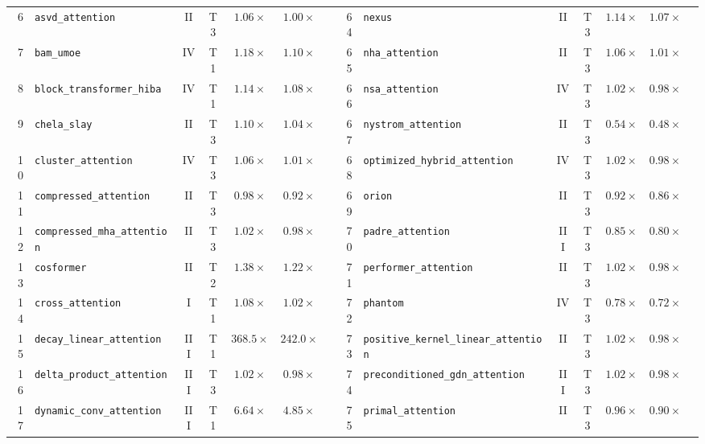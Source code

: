 \begin{table}[p]
{\begin{tabular}{r l c c c c l | r l c c c c l}
 6 & \texttt{asvd\_attention} & II & T3 & $1.06\times$ & $1.00\times$ & \passfast{} & 64 & \texttt{nexus} & II & T3 & $1.14\times$ & $1.07\times$ & \passfast{} \\
 7 & \texttt{bam\_umoe} & IV & T1 & $1.18\times$ & $1.10\times$ & \passfast{} & 65 & \texttt{nha\_attention} & II & T3 & $1.06\times$ & $1.01\times$ & \passfast{} \\
 8 & \texttt{block\_transformer\_hiba} & IV & T1 & $1.14\times$ & $1.08\times$ & \passfast{} & 66 & \texttt{nsa\_attention} & IV & T3 & $1.02\times$ & $0.98\times$ & \passslow{} \\
 9 & \texttt{chela\_slay} & II & T3 & $1.10\times$ & $1.04\times$ & \passfast{} & 67 & \texttt{nystrom\_attention} & II & T3 & $0.54\times$ & $0.48\times$ & \passslow{} \\
10 & \texttt{cluster\_attention} & IV & T3 & $1.06\times$ & $1.01\times$ & \passfast{} & 68 & \texttt{optimized\_hybrid\_attention} & IV & T3 & $1.02\times$ & $0.98\times$ & \passslow{} \\
11 & \texttt{compressed\_attention} & II & T3 & $0.98\times$ & $0.92\times$ & \passslow{} & 69 & \texttt{orion} & II & T3 & $0.92\times$ & $0.86\times$ & \passslow{} \\
12 & \texttt{compressed\_mha\_attention} & II & T3 & $1.02\times$ & $0.98\times$ & \passslow{} & 70 & \texttt{padre\_attention} & III & T3 & $0.85\times$ & $0.80\times$ & \passslow{} \\
13 & \texttt{cosformer} & II & T2 & $1.38\times$ & $1.22\times$ & \passfast{} & 71 & \texttt{performer\_attention} & II & T3 & $1.02\times$ & $0.98\times$ & \passslow{} \\
14 & \texttt{cross\_attention} & I & T1 & $1.08\times$ & $1.02\times$ & \passfast{} & 72 & \texttt{phantom} & IV & T3 & $0.78\times$ & $0.72\times$ & \passslow{} \\
15 & \texttt{decay\_linear\_attention} & III & T1 & $368.5\times$ & $242.0\times$ & \passfast{} & 73 & \texttt{positive\_kernel\_linear\_attention} & II & T3 & $1.02\times$ & $0.98\times$ & \passslow{} \\
16 & \texttt{delta\_product\_attention} & III & T3 & $1.02\times$ & $0.98\times$ & \passslow{} & 74 & \texttt{preconditioned\_gdn\_attention} & III & T3 & $1.02\times$ & $0.98\times$ & \passslow{} \\
17 & \texttt{dynamic\_conv\_attention} & III & T1 & $6.64\times$ & $4.85\times$ & \passfast{} & 75 & \texttt{primal\_attention} & II & T3 & $0.96\times$ & $0.90\times$ & \passslow{} \\

\end{tabular}}
\end{table}
